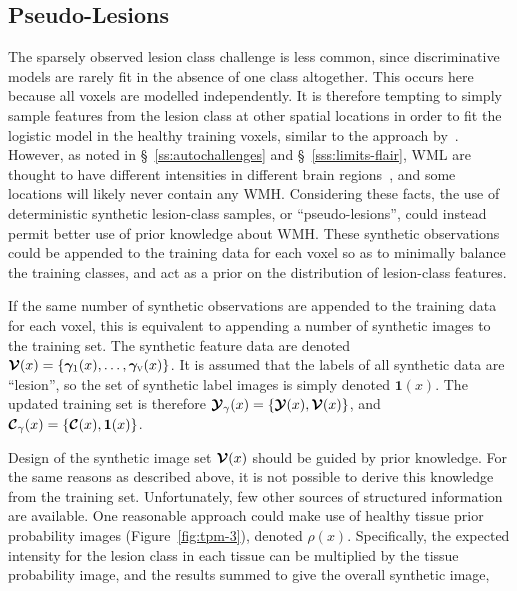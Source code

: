 \subsection{Pseudo-Lesions}\label{ss:vlr-reg-pseudo}
The sparsely observed lesion class challenge is less common,
since discriminative models are rarely fit in the absence of one class altogether.
This occurs here because all voxels are modelled independently.
It is therefore tempting to simply sample features from the lesion class at other spatial locations
in order to fit the logistic model in the healthy training voxels,
similar to the approach by~\citeauthor{Schmidt2017a}.
However, as noted in \S~\ref{ss:autochallenges} and \S~\ref{sss:limits-flair},
WML are thought to have different intensities
in different brain regions~\cite{Stevenson2000,Sled2004},
and some locations will likely never contain any WMH.
Considering these facts, the use of deterministic synthetic lesion-class samples,
or ``pseudo-lesions'', could instead permit better use of prior knowledge about WMH.
These synthetic observations could be appended to the training data for each voxel
so as to minimally balance the training classes,
and act as a prior on the distribution of lesion-class features.
\par
If the same number of synthetic observations are appended to the training data for each voxel,
this is equivalent to appending a number of synthetic images to the training set.
The synthetic feature data are denoted
$\bm{\mathcal{V}}(x) = \{\bm{\gamma}_{1}(x),\dots,\bm{\gamma}_{\textsc{v}}(x)\}$.
It is assumed that the labels of all synthetic data are ``lesion'',
so the set of synthetic label images is simply denoted $\bm{1}(x)$.
The updated training set is therefore
$\bm{\mathcal{Y}}_{\gamma}(x) = \{\bm{\mathcal{Y}}(x),\bm{\mathcal{V}}(x)\}$, and $\bm{\mathcal{C}}_{\gamma}(x) = \{\bm{\mathcal{C}}(x),\bm{1}(x)\}$.
\par
Design of the synthetic image set $\bm{\mathcal{V}}(x)$ should be guided by prior knowledge.
For the same reasons as described above,
it is not possible to derive this knowledge from the training set.
Unfortunately, few other sources of structured information are available.
One reasonable approach could make use of healthy tissue prior probability images
(Figure~\ref{fig:tpm-3}), denoted $\rho(x)$.
Specifically, the expected intensity for the lesion class in each tissue
can be multiplied by the tissue probability image,
and the results summed to give the overall synthetic image,
